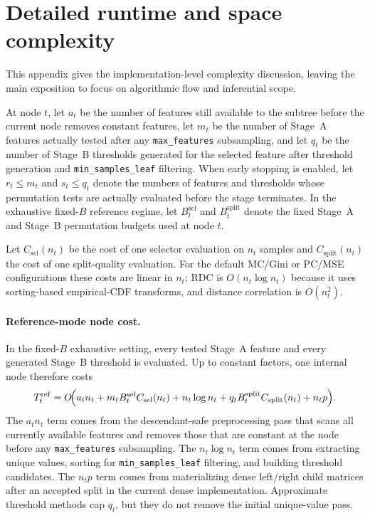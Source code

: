 \section{Detailed runtime and space complexity}
\label{app:complexity-details}

This appendix gives the implementation-level complexity discussion, leaving
the main exposition to focus on algorithmic flow and inferential scope.

At node $t$, let $a_t$ be the number of features still available to the
subtree before the current node removes constant features, let $m_t$ be the
number of Stage~A features actually tested after any \texttt{max\_features}
subsampling, and let $q_t$ be the number of Stage~B thresholds generated for
the selected feature after threshold generation and
\texttt{min\_samples\_leaf} filtering. When early stopping is enabled, let
$r_t \le m_t$ and $s_t \le q_t$ denote the numbers of features and thresholds
whose permutation tests are actually evaluated before the stage terminates.
In the exhaustive fixed-$B$ reference regime, let $B_t^{\mathrm{sel}}$ and
$B_t^{\mathrm{split}}$ denote the fixed Stage~A and Stage~B permutation budgets
used at node $t$.

Let $C_{\mathrm{sel}}(n_t)$ be the cost of one selector evaluation on $n_t$
samples and $C_{\mathrm{split}}(n_t)$ the cost of one split-quality
evaluation. For the default MC/Gini or PC/MSE configurations these costs are
linear in $n_t$; RDC is $O(n_t \log n_t)$ because it uses sorting-based
empirical-CDF transforms, and distance correlation is $O(n_t^2)$.

\paragraph{Reference-mode node cost.}
In the fixed-$B$ exhaustive setting, every tested Stage~A feature and every
generated Stage~B threshold is evaluated. Up to constant factors, one internal
node therefore costs
%
\begin{equation}
  T_t^{\mathrm{ref}}
  =
  O\!\Bigl(
    a_t n_t
    +
    m_t B_t^{\mathrm{sel}} C_{\mathrm{sel}}(n_t)
    + n_t \log n_t
    + q_t B_t^{\mathrm{split}} C_{\mathrm{split}}(n_t)
    + n_t p
  \Bigr).
\end{equation}
%
The $a_t n_t$ term comes from the descendant-safe preprocessing pass that
scans all currently available features and removes those that are constant at
the node before any \texttt{max\_features} subsampling. The $n_t \log n_t$
term comes from extracting unique values, sorting for
\texttt{min\_samples\_leaf} filtering, and building threshold candidates. The
$n_t p$ term comes from materializing dense left/right child matrices after an
accepted split in the current dense implementation. Approximate threshold
methods cap $q_t$, but they do not remove the initial unique-value pass.

